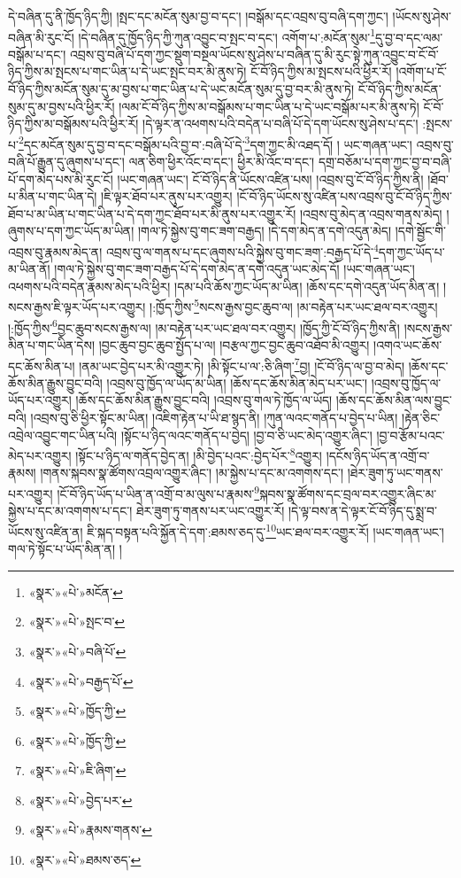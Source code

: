 དེ་བཞིན་དུ་ནི་ཁྱོད་ཉིད་ཀྱི། །སྤང་དང་མངོན་སུམ་བྱ་བ་དང་། །བསྒོམ་དང་འབྲས་བུ་བཞི་དག་ཀྱང་། །ཡོངས་སུ་ཤེས་བཞིན་མི་རུང་ངོ། །དེ་བཞིན་དུ་ཁྱོད་ཉིད་ཀྱི་ཀུན་འབྱུང་བ་སྤང་བ་དང་། འགོག་པ་:མངོན་སུམ་\footnote{«སྣར་»«པེ་»མངོན་}དུ་བྱ་བ་དང་ལམ་བསྒོམ་པ་དང་། འབྲས་བུ་བཞི་པོ་དག་ཀྱང་སྡུག་བསྔལ་ཡོངས་སུ་ཤེས་པ་བཞིན་དུ་མི་རུང་སྟེ་ཀུན་འབྱུང་བ་ངོ་བོ་ཉིད་ཀྱིས་མ་སྤངས་པ་གང་ཡིན་པ་དེ་ཡང་སྤང་བར་མི་ནུས་ཏེ། ངོ་བོ་ཉིད་ཀྱིས་མ་སྤངས་པའི་ཕྱིར་རོ། །འགོག་པ་ངོ་བོ་ཉིད་ཀྱིས་མངོན་སུམ་དུ་མ་བྱས་པ་གང་ཡིན་པ་དེ་ཡང་མངོན་སུམ་དུ་བྱ་བར་མི་ནུས་ཏེ། ངོ་བོ་ཉིད་ཀྱིས་མངོན་སུམ་དུ་མ་བྱས་པའི་ཕྱིར་རོ། །ལམ་ངོ་བོ་ཉིད་ཀྱིས་མ་བསྒོམས་པ་གང་ཡིན་པ་དེ་ཡང་བསྒོམ་པར་མི་ནུས་ཏེ། ངོ་བོ་ཉིད་ཀྱིས་མ་བསྒོམས་པའི་ཕྱིར་རོ། །དེ་ལྟར་ན་འཕགས་པའི་བདེན་པ་བཞི་པོ་དེ་དག་ཡོངས་སུ་ཤེས་པ་དང་། :སྤངས་པ་\footnote{«སྣར་»«པེ་»སྤང་བ་}དང་མངོན་སུམ་དུ་བྱ་བ་དང་བསྒོམ་པའི་བྱ་བ་:བཞི་པོ་དེ་\footnote{«སྣར་»«པེ་»བཞི་པོ་}དག་ཀྱང་མི་འཐད་དོ། །
ཡང་གཞན་ཡང་། འབྲས་བུ་བཞི་པོ་རྒྱུན་དུ་ཞུགས་པ་དང་། ལན་ཅིག་ཕྱིར་འོང་བ་དང་། ཕྱིར་མི་འོང་བ་དང་། དགྲ་བཅོམ་པ་དག་ཀྱང་བྱ་བ་བཞི་པོ་དག་མེད་པས་མི་རུང་ངོ། །ཡང་གཞན་ཡང་། ངོ་བོ་ཉིད་ནི་ཡོངས་འཛིན་པས། །འབྲས་བུ་ངོ་བོ་ཉིད་ཀྱིས་ནི། །ཐོབ་པ་མིན་པ་གང་ཡིན་དེ། །ཇི་ལྟར་ཐོབ་པར་ནུས་པར་འགྱུར། །ངོ་བོ་ཉིད་ཡོངས་སུ་འཛིན་པས་འབྲས་བུ་ངོ་བོ་ཉིད་ཀྱིས་ཐོབ་པ་མ་ཡིན་པ་གང་ཡིན་པ་དེ་དག་ཀྱང་ཐོབ་པར་མི་ནུས་པར་འགྱུར་རོ། །འབྲས་བུ་མེད་ན་འབྲས་གནས་མེད། །ཞུགས་པ་དག་ཀྱང་ཡོད་མ་ཡིན། །གལ་ཏེ་སྐྱེས་བུ་གང་ཟག་བརྒྱད། །དེ་དག་མེད་ན་དགེ་འདུན་མེད། །དགེ་སྦྱོང་གི་འབྲས་བུ་རྣམས་མེད་ན། འབྲས་བུ་ལ་གནས་པ་དང་ཞུགས་པའི་སྐྱེས་བུ་གང་ཟག་:བརྒྱད་པོ་དེ་\footnote{«སྣར་»«པེ་»བརྒྱད་པོ་}དག་ཀྱང་ཡོད་པ་མ་ཡིན་ནོ། །གལ་ཏེ་སྐྱེས་བུ་གང་ཟག་བརྒྱད་པོ་དེ་དག་མེད་ན་དགེ་འདུན་ཡང་མེད་དོ། །ཡང་གཞན་ཡང་། འཕགས་པའི་བདེན་རྣམས་མེད་པའི་ཕྱིར། །དམ་པའི་ཆོས་ཀྱང་ཡོད་མ་ཡིན། །ཆོས་དང་དགེ་འདུན་ཡོད་མིན་ན། །སངས་རྒྱས་ཇི་ལྟར་ཡོད་པར་འགྱུར། །:ཁྱོད་ཀྱིས་\footnote{«སྣར་»«པེ་»ཁྱོད་ཀྱི་}སངས་རྒྱས་བྱང་ཆུབ་ལ། །མ་བརྟེན་པར་ཡང་ཐལ་བར་འགྱུར། །:ཁྱོད་ཀྱིས་\footnote{«སྣར་»«པེ་»ཁྱོད་ཀྱི་}བྱང་ཆུབ་སངས་རྒྱས་ལ། །མ་བརྟེན་པར་ཡང་ཐལ་བར་འགྱུར། །ཁྱོད་ཀྱི་ངོ་བོ་ཉིད་ཀྱིས་ནི། །སངས་རྒྱས་མིན་པ་གང་ཡིན་དེས། །བྱང་ཆུབ་བྱང་ཆུབ་སྤྱོད་པ་ལ། །བརྩལ་ཀྱང་བྱང་ཆུབ་འཐོབ་མི་འགྱུར། །འགའ་ཡང་ཆོས་དང་ཆོས་མིན་པ། །ནམ་ཡང་བྱེད་པར་མི་འགྱུར་ཏེ། །མི་སྟོང་པ་ལ་:ཅི་ཞིག་\footnote{«སྣར་»«པེ་»ཇི་ཞིག་}བྱ། །ངོ་བོ་ཉིད་ལ་བྱ་བ་མེད། །ཆོས་དང་ཆོས་མིན་རྒྱུས་བྱུང་བའི། །འབྲས་བུ་ཁྱོད་ལ་ཡོད་མ་ཡིན། །ཆོས་དང་ཆོས་མིན་མེད་པར་ཡང་། །འབྲས་བུ་ཁྱོད་ལ་ཡོད་པར་འགྱུར། །ཆོས་དང་ཆོས་མིན་རྒྱུས་བྱུང་བའི། །འབྲས་བུ་གལ་ཏེ་ཁྱོད་ལ་ཡོད། །ཆོས་དང་ཆོས་མིན་ལས་བྱུང་བའི། །འབྲས་བུ་ཅི་ཕྱིར་སྟོང་མ་ཡིན། །འཇིག་རྟེན་པ་ཡི་ཐ་སྙད་ནི། །ཀུན་ལའང་གནོད་པ་བྱེད་པ་ཡིན། །རྟེན་ཅིང་འབྲེལ་འབྱུང་གང་ཡིན་པའི། །སྟོང་པ་ཉིད་ལའང་གནོད་པ་བྱེད། །བྱ་བ་ཅི་ཡང་མེད་འགྱུར་ཞིང་། །བྱ་བ་རྩོམ་པའང་མེད་པར་འགྱུར། །སྟོང་པ་ཉིད་ལ་གནོད་བྱེད་ན། །མི་བྱེད་པའང་:བྱེད་པོར་\footnote{«སྣར་»«པེ་»བྱེད་པར་}འགྱུར། །དངོས་ཉིད་ཡོད་ན་འགྲོ་བ་རྣམས། །གནས་སྐབས་སྣ་ཚོགས་འབྲལ་འགྱུར་ཞིང་། །མ་སྐྱེས་པ་དང་མ་འགགས་དང་། །ཐེར་ཟུག་ཏུ་ཡང་གནས་པར་འགྱུར། །ངོ་བོ་ཉིད་ཡོད་པ་ཡིན་ན་འགྲོ་བ་མ་ལུས་པ་རྣམས་\footnote{«སྣར་»«པེ་»རྣམས་གནས་}སྐབས་སྣ་ཚོགས་དང་བྲལ་བར་འགྱུར་ཞིང་མ་སྐྱེས་པ་དང་མ་འགགས་པ་དང་། ཐེར་ཟུག་ཏུ་གནས་པར་ཡང་འགྱུར་རོ། །དེ་ལྟ་བས་ན་དེ་ལྟར་ངོ་བོ་ཉིད་དུ་སྨྲ་བ་ཡོངས་སུ་འཛིན་ན། ཇི་སྐད་བསྟན་པའི་སྐྱོན་དེ་དག་:ཐམས་ཅད་དུ་\footnote{«སྣར་»«པེ་»ཐམས་ཅད་}ཡང་ཐལ་བར་འགྱུར་རོ། །ཡང་གཞན་ཡང་། གལ་ཏེ་སྟོང་པ་ཡོད་མིན་ན། །
